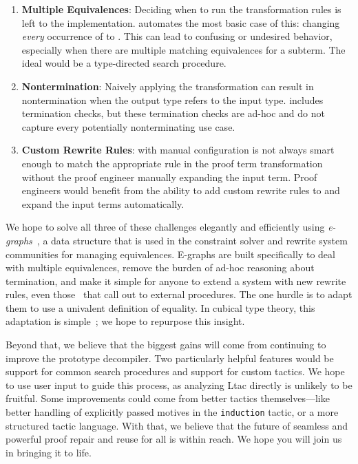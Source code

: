 \begin{enumerate}
\item \textbf{Multiple Equivalences}: Deciding when to run the transformation rules is left to the implementation.
\toolname automates the most basic case of this: changing \textit{every} occurrence of \A to \B.
This can lead to confusing or undesired behavior, especially when there are multiple matching equivalences for a subterm.
The ideal would be a type-directed search procedure.
\item \textbf{Nontermination}: Naively applying the transformation can result in nontermination when the output type refers to the input type.
\toolname includes termination checks, but these termination checks are ad-hoc and do not capture every potentially nonterminating use case.
\item \textbf{Custom Rewrite Rules}: \toolname with manual configuration is not always smart enough to match the appropriate rule in the proof term
transformation without the proof engineer manually expanding the input term.
Proof engineers would benefit from the ability to add custom rewrite rules to \toolname
and expand the input terms automatically.
\end{enumerate}
We hope to solve all three of these challenges elegantly and efficiently using \textit{e-graphs}~\cite{egraph1},
a data structure that is used in the constraint solver and rewrite system communities for managing equivalences.
E-graphs are built specifically to deal with multiple equivalences,
remove the burden of ad-hoc reasoning about termination,
and make it simple for anyone to extend a system with new
rewrite rules, even those~\cite{egraph5} that call out
to external procedures.
The one hurdle is to adapt them to use a univalent definition of equality.
In cubical type theory, this adaptation is simple~\cite{egraph6}; we hope to repurpose this insight.

Beyond that, we believe that the biggest gains will come from continuing to improve the prototype decompiler.
Two particularly helpful features would be support for common search procedures and support for custom tactics.
We hope to use user input to guide this process, as analyzing Ltac directly is unlikely to be fruitful.
Some improvements could come from better tactics themselves---like better handling of explicitly passed 
motives in the \lstinline{induction} tactic, or a more structured tactic language.
With that, we believe that the future of seamless and powerful proof repair and reuse for all is within reach.
We hope you will join us in bringing it to life.



